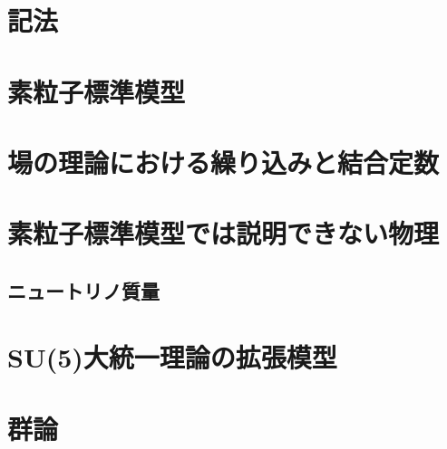 \documentclass[uplatex,dvipdfmx,a4paper,titlepage,10pt]{jsreport}
\theoremstyle{plain}
\theoremstyle{definition}
\begin{document}
\chapter{記法}


\chapter{素粒子標準模型}


\chapter{場の理論における繰り込みと結合定数}


\chapter{素粒子標準模型では説明できない物理}


\section{ニュートリノ質量}





\chapter{SU(5)大統一理論の拡張模型}


\appendix
\chapter{群論}




\end{document}
